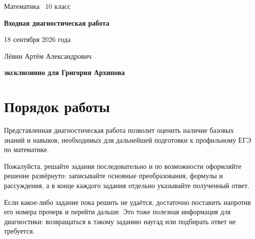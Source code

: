 \documentclass[a4paper,12pt]{article}
\begin{document}

\begin{titlepage}
\thispagestyle{empty}

\vspace*{26mm}

{\color{soft}\large
Математика \textbullet\ 10 класс
\par}

\vspace{18mm}

{\Huge\bfseries\color{accent}
Входная диагностическая работа
\par}

\vspace{8mm}

{\Large
18 сентября 2026 года
\par}

\vfill

{\large
Лёвин Артём Александрович
\par}

\vspace{2mm}

{\large\bfseries
эксклюзивно для Григория Архипова
\par}

\vspace*{18mm}

\end{titlepage}


\thispagestyle{fancy}

\section*{Порядок работы}

Представленная диагностическая работа позволит оценить наличие базовых
знаний и навыков, необходимых для дальнейшей подготовки к профильному ЕГЭ
по математике.

Пожалуйста, решайте задания последовательно и по возможности оформляйте
решение развёрнуто: записывайте основные преобразования, формулы и
рассуждения, а в конце каждого задания отдельно указывайте полученный ответ.

Если какое-либо задание пока решить не удаётся, достаточно поставить
напротив его номера прочерк и перейти дальше. Это тоже полезная информация
для диагностики: возвращаться к такому заданию наугад или подбирать ответ
не требуется.
\end{document}
